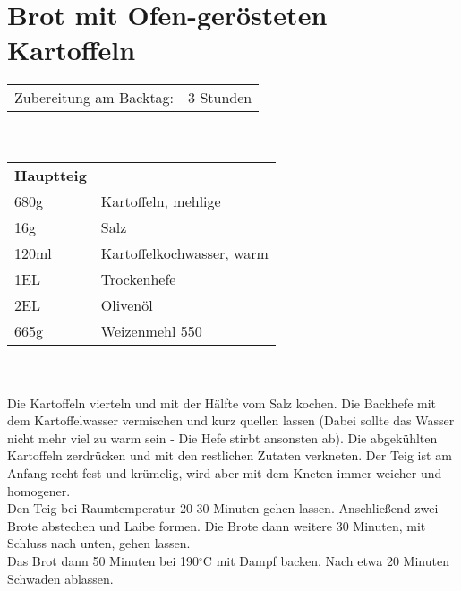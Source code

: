 \section{Brot mit Ofen-gerösteten Kartoffeln}
\begin{tabular}{ll}
    Zubereitung am Backtag:& 3 Stunden\\
\end{tabular}\\\paragraph*{}
\begin{tabular}{ll}
    \textbf{Hauptteig} \\
    680g  & Kartoffeln, mehlige       \\
    16g   & Salz                      \\
    120ml & Kartoffelkochwasser, warm \\
    1EL   & Trockenhefe               \\
    2EL   & Olivenöl                  \\
    665g  & Weizenmehl 550            \\
\end{tabular}\\\paragraph*{}
Die Kartoffeln vierteln und mit der Hälfte vom Salz kochen. Die Backhefe mit dem Kartoffelwasser vermischen und kurz quellen lassen (Dabei sollte das Wasser nicht mehr viel zu warm sein - Die Hefe stirbt ansonsten ab). Die abgekühlten Kartoffeln zerdrücken und mit den restlichen Zutaten verkneten. Der Teig ist am Anfang recht fest und krümelig, wird aber mit dem Kneten immer weicher und homogener.\\
Den Teig bei Raumtemperatur 20-30 Minuten gehen lassen. Anschließend zwei Brote abstechen und Laibe formen. Die Brote dann weitere 30 Minuten, mit Schluss nach unten, gehen lassen.\\
Das Brot dann 50 Minuten bei 190$^\circ$C mit Dampf backen. Nach etwa 20 Minuten Schwaden ablassen.


